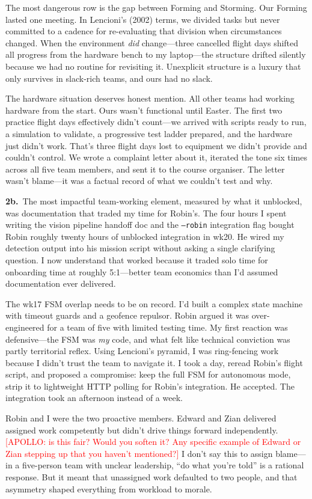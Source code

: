 The most dangerous row is the gap between Forming and Storming. Our Forming lasted one meeting. In Lencioni's (2002) terms, we divided tasks but never committed to a cadence for re-evaluating that division when circumstances changed. When the environment \emph{did} change---three cancelled flight days shifted all progress from the hardware bench to my laptop---the structure drifted silently because we had no routine for revisiting it. Unexplicit structure is a luxury that only survives in slack-rich teams, and ours had no slack.

The hardware situation deserves honest mention. All other teams had working hardware from the start. Ours wasn't functional until Easter. The first two practice flight days effectively didn't count---we arrived with scripts ready to run, a simulation to validate, a progressive test ladder prepared, and the hardware just didn't work. That's three flight days lost to equipment we didn't provide and couldn't control. We wrote a complaint letter about it, iterated the tone six times across all five team members, and sent it to the course organiser. The letter wasn't blame---it was a factual record of what we couldn't test and why.

\textbf{2b.}~The most impactful team-working element, measured by what it unblocked, was documentation that traded my time for Robin's. The four hours I spent writing the vision pipeline handoff doc and the \texttt{--robin} integration flag bought Robin roughly twenty hours of unblocked integration in wk20. He wired my detection output into his mission script without asking a single clarifying question. I now understand that worked because it traded solo time for onboarding time at roughly 5:1---better team economics than I'd assumed documentation ever delivered.

The wk17 FSM overlap needs to be on record. I'd built a complex state machine with timeout guards and a geofence repulsor. Robin argued it was over-engineered for a team of five with limited testing time. My first reaction was defensive---the FSM was \emph{my} code, and what felt like technical conviction was partly territorial reflex. Using Lencioni's pyramid, I was ring-fencing work because I didn't trust the team to navigate it. I took a day, reread Robin's flight script, and proposed a compromise: keep the full FSM for autonomous mode, strip it to lightweight HTTP polling for Robin's integration. He accepted. The integration took an afternoon instead of a week.

Robin and I were the two proactive members. Edward and Zian delivered assigned work competently but didn't drive things forward independently. \textcolor{red}{[APOLLO: is this fair? Would you soften it? Any specific example of Edward or Zian stepping up that you haven't mentioned?]} I don't say this to assign blame---in a five-person team with unclear leadership, ``do what you're told'' is a rational response. But it meant that unassigned work defaulted to two people, and that asymmetry shaped everything from workload to morale.

